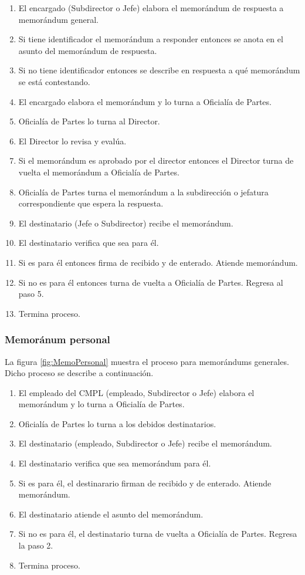 	\begin{enumerate}
		\item El encargado (Subdirector o Jefe) elabora el memorándum de respuesta a memorándum general.
		\item Si tiene identificador el memorándum a responder entonces se anota en el asunto del memorándum de respuesta.
		\item Si no tiene identificador entonces se describe en respuesta a qué memorándum se está contestando.
		\item El encargado elabora el memorándum y lo turna a Oficialía de Partes.
		\item Oficialía de Partes lo turna al Director.
		\item El Director lo revisa y evalúa.
		\item Si el memorándum es aprobado por el director entonces el Director turna de vuelta el memorándum a Oficialía de Partes.
		\item Oficialía de Partes turna el memorándum a la subdirección o jefatura correspondiente que espera la respuesta.
		\item El destinatario (Jefe o Subdirector) recibe el memorándum.
		\item El destinatario verifica que sea para él.
		\item Si es para él entonces firma de recibido y de enterado. Atiende memorándum.
		\item Si no es para él entonces turna de vuelta a Oficialía de Partes. Regresa al paso 5.
		\item Termina proceso.
	\end{enumerate}
	
	\subsubsection{Memoránum personal}
	La figura \ref{fig:MemoPersonal} muestra el proceso para memorándums generales. Dicho proceso se describe a continuación.
	
	\begin{enumerate}
		\item El empleado del CMPL (empleado, Subdirector o Jefe) elabora el memorándum y lo turna a Oficialía de Partes.
		\item Oficialía de Partes lo turna a los debidos destinatarios.
		\item El destinatario (empleado, Subdirector o Jefe) recibe el memorándum.
		\item El destinatario verifica que sea memorándum para él.
		\item Si es para él, el destinarario firman de recibido y de enterado. Atiende memorándum.
		\item El destinatario atiende el asunto del memorándum.
		\item Si no es para él, el destinatario turna de vuelta a Oficialía de Partes. Regresa la paso 2.
		\item Termina proceso.
	\end{enumerate}
	
